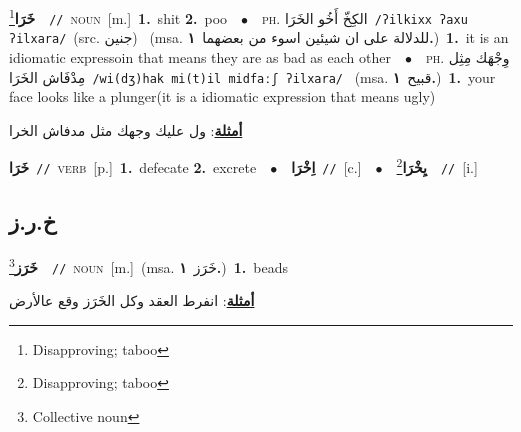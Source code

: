 \documentclass[10pt,a4paper,twoside]{article} %
\begin{document}
\begin{multicols}{2}
{\setlength\topsep{0pt}\textbf{\foreignlanguage{arabic}{خَرَا}}\footnote{Disapproving; taboo}\ \ {\color{gray}\texttt{//}\color{black}}\ \textsc{noun}\ [m.]\ \textbf{1.}~shit  \textbf{2.}~poo\ \ $\bullet$\ \ \textsc{ph.} \color{gray} \foreignlanguage{arabic}{الكِخّ أَخُو الخَرَا}\color{black}\ {\color{gray}\texttt{/{\sffamily ʔilkixx ʔaxu ʔilxara}/}\color{black}}\ \color{gray}(src. \foreignlanguage{arabic}{جنين})\color{black}\ \color{gray} (msa. \foreignlanguage{arabic}{للدلالة على ان شيئين اسوء من بعضهما}~\foreignlanguage{arabic}{\textbf{١.}})\color{black}\ \textbf{1.}~it is an idiomatic expressoin that means they are as bad as each other\ \ $\bullet$\ \ \textsc{ph.} \color{gray} \foreignlanguage{arabic}{وِجْهَك مِثِل مِدْفَاش الخَرَا}\color{black}\ {\color{gray}\texttt{/{\sffamily wi(dʒ)hak mi(t)il midfaːʃ ʔilxara}/}\color{black}}\ \color{gray} (msa. \foreignlanguage{arabic}{قبيح}~\foreignlanguage{arabic}{\textbf{١.}})\color{black}\ \textbf{1.}~your face looks like a plunger(it is a idiomatic expression that means ugly)\  \begin{flushright}\color{gray}\foreignlanguage{arabic}{\textbf{\underline{\foreignlanguage{arabic}{أمثلة}}}: ول عليك وجهك مثل مدفاش الخرا}\end{flushright}\color{black}} \vspace{2mm}

{\setlength\topsep{0pt}\textbf{\foreignlanguage{arabic}{خَرَا}}\ {\color{gray}\texttt{//}\color{black}}\ \textsc{verb}\ [p.]\ \textbf{1.}~defecate  \textbf{2.}~excrete\ \ $\bullet$\ \ \setlength\topsep{0pt}\textbf{\foreignlanguage{arabic}{اِخْرَا}}\ {\color{gray}\texttt{//}\color{black}}\ [c.]\ \ $\bullet$\ \ \setlength\topsep{0pt}\textbf{\foreignlanguage{arabic}{يِخْرَا}}\footnote{Disapproving; taboo}\ \ {\color{gray}\texttt{//}\color{black}}\ [i.]\ } \vspace{2mm}

\vspace{-3mm}
\subsection*{\color{blue}\foreignlanguage{arabic}{خ.ر.ز}\color{blue}{}} 

{\setlength\topsep{0pt}\textbf{\foreignlanguage{arabic}{خَرَز}}\footnote{Collective noun}\ \ {\color{gray}\texttt{//}\color{black}}\ \textsc{noun}\ [m.]\ \color{gray}(msa. \foreignlanguage{arabic}{خَرَز}~\foreignlanguage{arabic}{\textbf{١.}})\color{black}\ \textbf{1.}~beads\  \begin{flushright}\color{gray}\foreignlanguage{arabic}{\textbf{\underline{\foreignlanguage{arabic}{أمثلة}}}: انفرط العقد وكل الخَرَز وقع عالأرض}\end{flushright}\color{black}} \vspace{2mm}


\end{multicols}
\end{document}
